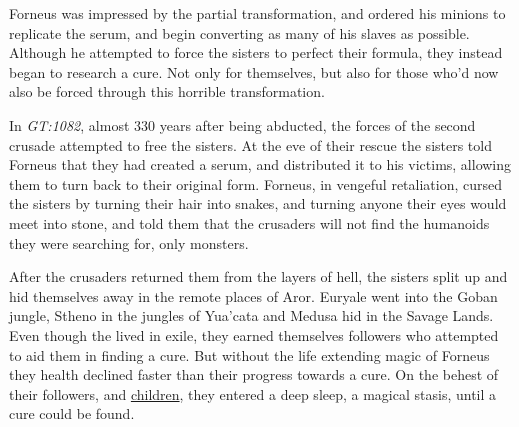 Forneus was impressed by the partial transformation, and ordered his minions to
replicate the serum, and begin converting as many of his slaves as possible.
Although he attempted to force the sisters to perfect their formula, they
instead began to research a cure. Not only for themselves, but also for those
who'd now also be forced through this horrible transformation.

In \emph{GT:1082}, almost 330 years after being abducted, the forces of the
second crusade attempted to free the sisters. At the eve of their rescue the
sisters told Forneus that they had created a serum, and distributed it to his
victims, allowing them to turn back to their original form. Forneus, in
vengeful retaliation, cursed the sisters by turning their hair into snakes,
and turning anyone their eyes would meet into stone, and told them that the
crusaders will not find the humanoids they were searching for, only monsters.

After the crusaders returned them from the layers of hell, the sisters split
up and hid themselves away in the remote places of Aror. Euryale went into the
Goban jungle, Stheno in the jungles of Yua'cata and Medusa hid in the Savage
Lands. Even though the lived in exile, they earned themselves followers who
attempted to aid them in finding a cure. But without the life extending magic
of Forneus they health declined faster than their progress towards a cure. On
the behest of their followers, and \hyperref[sec:Medusa]{children}, they
entered a deep sleep, a magical stasis, until a cure could be found.

